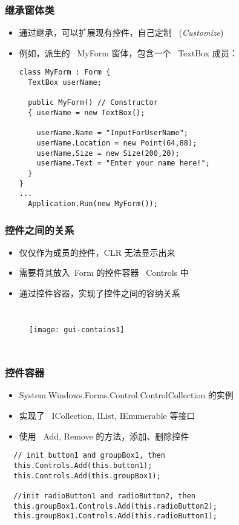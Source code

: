 \begin{frame}[fragile]
\frametitle{继承窗体类}
\begin{itemize}
\item 通过继承，可以扩展现有控件，自己定制 ~(\textit{Customize})
\item 例如，派生的 ~MyForm 窗体，包含一个 ~TextBox 成员：
\begin{lstlisting}
class MyForm : Form {
  TextBox userName;
  
  public MyForm() // Constructor
  { userName = new TextBox();

    userName.Name = "InputForUserName";
    userName.Location = new Point(64,88);
    userName.Size = new Size(200,20);
    userName.Text = "Enter your name here!";
  }
}
...
  Application.Run(new MyForm());
\end{lstlisting}
\end{itemize}
\end{frame}

\begin{frame}
\frametitle{控件之间的关系}
\begin{itemize}
\item 仅仅作为成员的控件，CLR 无法显示出来
\item 需要将其放入~Form 的{\redwarn 控件容器} ~Controls 中
\item 通过控件容器，实现了控件之间的容纳关系
\end{itemize}
\begin{columns}[t]
  \begin{figure}[htbp]
    \centering
    \texttt{[image: gui-contains1]}
  \end{figure}
  
\end{columns}
\end{frame}

\begin{frame}[fragile]
\frametitle{控件容器}
\begin{itemize}
\item System.Windows.Forms.Control.ControlCollection 的实例
\item 实现了 ~ICollection, IList, IEnumerable 等接口
\item 使用 ~Add, Remove 的方法，添加、删除控件
\end{itemize}
\begin{lstlisting}
  // init button1 and groupBox1, then 
  this.Controls.Add(this.button1);
  this.Controls.Add(this.groupBox1);

  //init radioButton1 and radioButton2, then
  this.groupBox1.Controls.Add(this.radioButton2);
  this.groupBox1.Controls.Add(this.radioButton1);
\end{lstlisting}
\end{frame}

